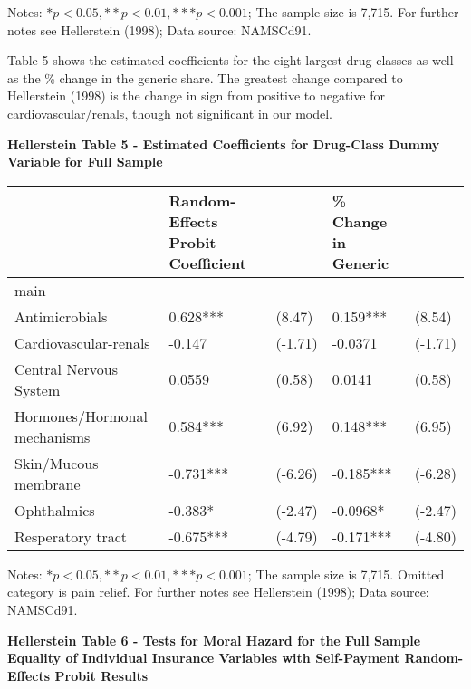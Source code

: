 \documentclass[
]{book}
\begin{document}
Notes: \(*p < 0.05, **p < 0.01, ***p < 0.001\); The sample size is
7,715. For further notes see Hellerstein (1998); Data source: NAMSCd91.

Table 5 shows the estimated coefficients for the eight largest drug
classes as well as the \% change in the generic share. The greatest
change compared to Hellerstein (1998) is the change in sign from
positive to negative for cardiovascular/renals, though not significant
in our model.

\textbf{Hellerstein Table 5 - Estimated Coefficients for Drug-Class
Dummy Variable for Full Sample}

\begin{longtable}[]{@{}lllll@{}}
\toprule
& Random-Effects Probit Coefficient & & \% Change in Generic
&\tabularnewline
\midrule
\endhead
main & & & &\tabularnewline
Antimicrobials & 0.628*** & (8.47) & 0.159*** & (8.54)\tabularnewline
Cardiovascular-renals & -0.147 & (-1.71) & -0.0371 &
(-1.71)\tabularnewline
Central Nervous System & 0.0559 & (0.58) & 0.0141 &
(0.58)\tabularnewline
Hormones/Hormonal mechanisms & 0.584*** & (6.92) & 0.148*** &
(6.95)\tabularnewline
Skin/Mucous membrane & -0.731*** & (-6.26) & -0.185*** &
(-6.28)\tabularnewline
Ophthalmics & -0.383* & (-2.47) & -0.0968* & (-2.47)\tabularnewline
Resperatory tract & -0.675*** & (-4.79) & -0.171*** &
(-4.80)\tabularnewline
\bottomrule
\end{longtable}

Notes: \(*p < 0.05, **p < 0.01, ***p < 0.001\); The sample size is
7,715. Omitted category is pain relief. For further notes see
Hellerstein (1998); Data source: NAMSCd91.

\textbf{Hellerstein Table 6 - Tests for Moral Hazard for the Full Sample
Equality of Individual Insurance Variables with Self-Payment
Random-Effects Probit Results}
\end{document}
